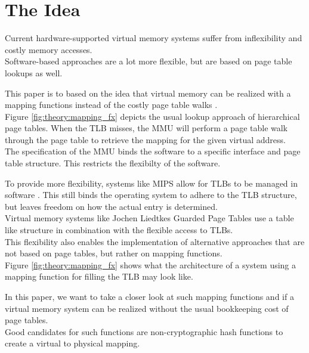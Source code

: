 \section{The Idea}


Current hardware-supported virtual memory systems suffer from inflexibility and costly memory accesses.\\
Software-based approaches are a lot more flexible, but are based on page table lookups as well.

This paper is to based on the idea that virtual memory can be realized with a
mapping functions instead of the costly page table walks \cite{van2002memory}.\\


Figure \ref{fig:theory:mapping_fx} depicts the usual lookup approach of hierarchical page tables.
When the TLB misses, the MMU will perform a page table walk through the page table to retrieve the mapping
for the given virtual address.\\
The specification of the MMU binds the software to a specific interface and page table structure. This restricts
the flexibilty of the software.

To provide more flexibility, systems like MIPS allow for TLBs to be managed in software \cite{heiserAnatomyHighPerformanceMicrokernel}.
This still binds the operating system to adhere to the TLB structure, but leaves freedom on how the actual
entry is determined.\\
Virtual memory systems like Jochen Liedtkes Guarded Page Tables \cite{liedtkeGPT} use a table like structure
in combination with the flexible access to TLBs.\\
This flexibility also enables the implementation of alternative approaches that are not based on page tables,
but rather on mapping functions.\\
Figure \ref{fig:theory:mapping_fx} shows what the architecture of a system using a mapping function for
filling the TLB may look like.

In this paper, we want to take a closer look at such mapping functions and if a virtual memory system
can be realized without the usual bookkeeping cost of page tables.\\
Good candidates for such functions are non-cryptographic hash functions
to create a virtual to physical mapping.




